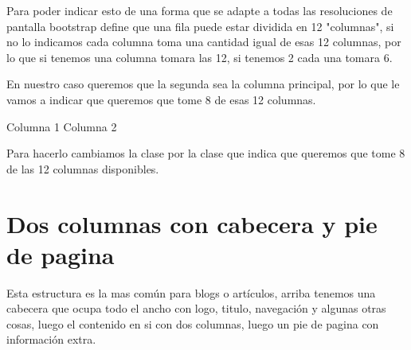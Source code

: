 \documentclass[letterpaper,10pt,spanish]{sphinxmanual}
\begin{document}
Para poder indicar esto de una forma que se adapte a todas las resoluciones de pantalla bootstrap define que una fila puede estar dividida en 12 "columnas", si no
lo indicamos cada columna toma una cantidad igual de esas 12 columnas, por lo
que si tenemos una columna tomara las 12, si tenemos 2 cada una tomara 6.

En nuestro caso queremos que la segunda sea la columna principal, por lo que le
vamos a indicar que queremos que tome 8 de esas 12 columnas.

%
\begin{sphinxVerbatim}[commandchars=\\\{\}]
 
  
   
    Columna 1
   
    Columna 2
\end{sphinxVerbatim}



Para hacerlo cambiamos la clase  por la clase  que indica que
queremos que tome 8 de las 12 columnas disponibles.


\section{Dos columnas con cabecera y pie de pagina}
\label{\detokenize{filas-columnas:dos-columnas-con-cabecera-y-pie-de-pagina}}
Esta estructura es la mas común para blogs o artículos, arriba tenemos una
cabecera que ocupa todo el ancho con logo, titulo, navegación y algunas otras
cosas, luego el contenido en si con dos columnas, luego un pie de pagina con
información extra.
\end{document}
